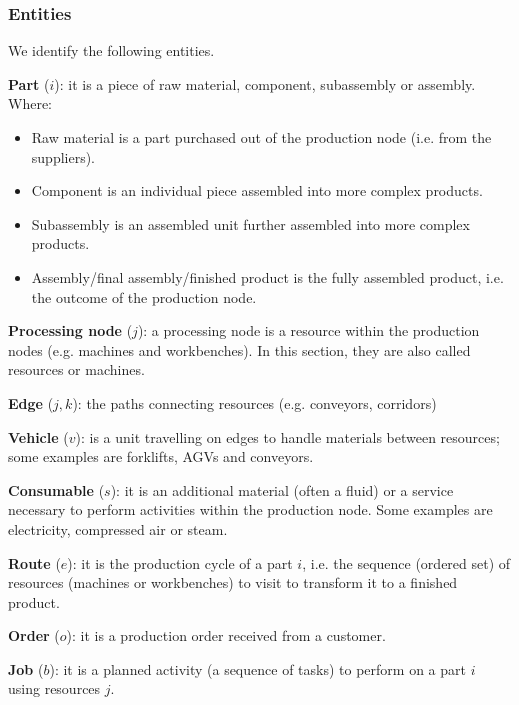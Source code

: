\subsubsection{Entities}
We identify the following entities.\par
\textbf{Part} ($i$): it is a piece of raw material, component, subassembly or assembly. Where:
\begin{itemize}
    \item Raw material is a part purchased out of the production node (i.e. from the suppliers).
    \item Component is an individual piece assembled into more complex products.
    \item Subassembly is an assembled unit further assembled into more complex products.
    \item Assembly/final assembly/finished product is the fully assembled product, i.e. the outcome of the production node.
\end{itemize}
\par

\textbf{Processing node} ($j$): a processing node is a resource within the production nodes (e.g. machines and workbenches). In this section, they are also called resources or machines. \par

\textbf{Edge} ($j,k$): the paths connecting resources (e.g. conveyors, corridors) \par

\textbf{Vehicle} ($v$): is a unit travelling on edges to handle materials between resources; some examples are forklifts, AGVs and conveyors. \par

\textbf{Consumable} ($s$): it is an additional material (often a fluid) or a service necessary to perform activities within the production node. Some examples are electricity, compressed air or steam. \par

\textbf{Route} ($e$): it is the production cycle of a part $i$, i.e. the sequence (ordered set) of resources (machines or workbenches) to visit to transform it to a finished product. \par

\textbf{Order} ($o$): it is a production order received from a customer. \par

\textbf{Job} ($b$): it is a planned activity (a sequence of tasks) to perform on a part $i$ using resources $j$. \par

